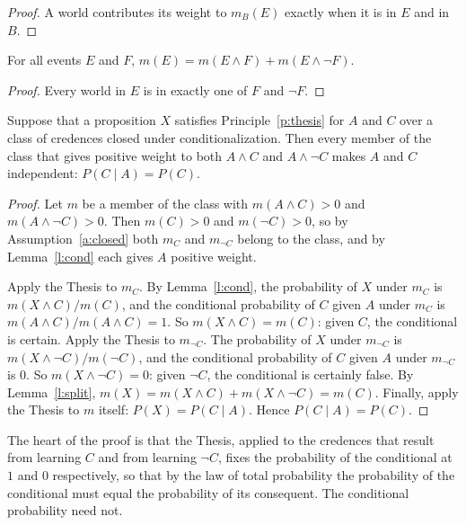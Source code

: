 \documentclass{situationist-preprint}
\begin{document}
\begin{proof}
A world contributes its weight to $m_B(E)$ exactly when it is in $E$ and in $B$.
\end{proof}

\begin{lemma}\label{l:split}
For all events $E$ and $F$, $m(E) = m(E \wedge F) + m(E \wedge \neg F)$.
\end{lemma}

\begin{proof}
Every world in $E$ is in exactly one of $F$ and $\neg F$.
\end{proof}

\begin{theorem}[Lewis]\label{t:lewis}
Suppose that a proposition $X$ satisfies Principle~\ref{p:thesis} for $A$ and $C$ over a class of credences closed under conditionalization. Then every member of the class that gives positive weight to both $A \wedge C$ and $A \wedge \neg C$ makes $A$ and $C$ independent: $P(C \mid A) = P(C)$.
\end{theorem}

\begin{proof}
Let $m$ be a member of the class with $m(A \wedge C) > 0$ and $m(A \wedge \neg C) > 0$. Then $m(C) > 0$ and $m(\neg C) > 0$, so by Assumption~\ref{a:closed} both $m_C$ and $m_{\neg C}$ belong to the class, and by Lemma~\ref{l:cond} each gives $A$ positive weight.

Apply the Thesis to $m_C$. By Lemma~\ref{l:cond}, the probability of $X$ under $m_C$ is $m(X \wedge C)/m(C)$, and the conditional probability of $C$ given $A$ under $m_C$ is $m(A \wedge C)/m(A \wedge C) = 1$. So $m(X \wedge C) = m(C)$: given $C$, the conditional is certain. Apply the Thesis to $m_{\neg C}$. The probability of $X$ under $m_{\neg C}$ is $m(X \wedge \neg C)/m(\neg C)$, and the conditional probability of $C$ given $A$ under $m_{\neg C}$ is $0$. So $m(X \wedge \neg C) = 0$: given $\neg C$, the conditional is certainly false. By Lemma~\ref{l:split}, $m(X) = m(X \wedge C) + m(X \wedge \neg C) = m(C)$. Finally, apply the Thesis to $m$ itself: $P(X) = P(C \mid A)$. Hence $P(C \mid A) = P(C)$.
\end{proof}

The heart of the proof is that the Thesis, applied to the credences that result from learning $C$ and from learning $\neg C$, fixes the probability of the conditional at $1$ and $0$ respectively, so that by the law of total probability the probability of the conditional must equal the probability of its consequent. The conditional probability need not.
\end{document}
